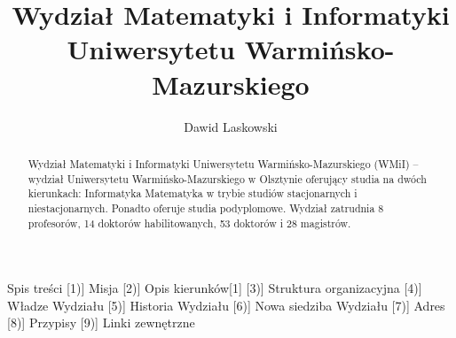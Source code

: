 \documentclass[a4paper,12pt]{article}
\title{Wydział Matematyki i Informatyki Uniwersytetu
Warmińsko-Mazurskiego}
\author{Dawid Laskowski}
\begin{document}
\maketitle

\begin{abstract}
Wydział Matematyki i Informatyki Uniwersytetu Warmińsko-Mazurskiego (WMiI) – wydział
Uniwersytetu Warmińsko-Mazurskiego w Olsztynie oferujący studia na dwóch kierunkach:
Informatyka
Matematyka
w trybie studiów stacjonarnych i niestacjonarnych. Ponadto oferuje studia podyplomowe.
Wydział zatrudnia 8 profesorów, 14 doktorów habilitowanych, 53 doktorów i 28 magistrów.
\end{abstract}
Spis treści
[1)] Misja
[2)] Opis kierunków[1]
[3)] Struktura organizacyjna
[4)] Władze Wydziału
[5)] Historia Wydziału
[6)] Nowa siedziba Wydziału
[7)] Adres
[8)] Przypisy
[9)] Linki zewnętrzne
\section{}
\end{document}
